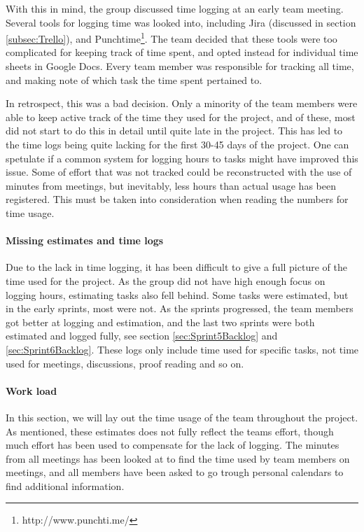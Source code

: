 \documentclass[11pt,a4paper,titlepage,oneside]{report}
\begin{document}
With this in mind, the group discussed time logging at an early team meeting. Several tools for logging time was looked into, including Jira (discussed in section \ref{subsec:Trello}), and Punchtime\footnote{http://www.punchti.me/}. The team decided that these tools were too complicated for keeping track of time spent, and opted instead for individual time sheets in Google Docs. Every team member was responsible for tracking all time, and making note of which task the time spent pertained to. 

In retrospect, this was a bad decision. Only a minority of the team members were able to keep active track of the time they used for the project, and of these, most did not start to do this in detail until quite late in the project. This has led to the time logs being quite lacking for the first 30-45 days of the project. One can spetulate if a common system for logging hours to tasks might have improved this issue. Some of effort that was not tracked could be reconstructed with the use of minutes from meetings, but inevitably, less hours than actual usage has been registered. This must be taken into consideration when reading the numbers for time usage.  

\paragraph{Missing estimates and time logs}
Due to the lack in time logging, it has been difficult to give a full picture of the time used for the project. As the group did not have high enough focus on logging hours, estimating tasks also fell behind. Some tasks were estimated, but in the early sprints, most were not. As the sprints progressed, the team members got better at logging and estimation, and the last two sprints were both estimated and logged fully, see section \ref{sec:Sprint5Backlog} and \ref{sec:Sprint6Backlog}. These logs only include time used for specific tasks, not time used for meetings, discussions, proof reading and so on.

\paragraph{Work load}
In this section, we will lay out the time usage of the team throughout the project. As mentioned, these estimates does not fully reflect the teams effort, though much effort has been used to compensate for the lack of logging. The minutes from all meetings has been looked at to find the time used by team members on meetings, and all members have been asked to go trough personal calendars to find additional information.
\end{document}
